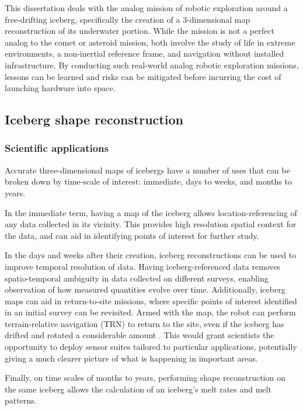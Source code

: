 This dissertation deals with the analog mission of robotic exploration around a free-drifting iceberg, specifically the creation of a 3-dimensional map reconstruction of its underwater portion. While the mission is not a perfect analog to the comet or asteroid mission, both involve the study of life in extreme environments, a non-inertial reference frame, and navigation without installed infrastructure.  By conducting such real-world analog robotic exploration missions, lessons can be learned and risks can be mitigated before incurring the cost of launching hardware into space. 

\subsection{Iceberg shape reconstruction}

\subsubsection{Scientific applications}

Accurate three-dimensional maps of icebergs have a number of uses that can be broken down by time-scale of interest: immediate, days to weeks, and months to years. 

In the immediate term, having a map of the iceberg allows location-referencing of any data collected in its vicinity. This provides high resolution spatial context for the data, and can aid in identifying points of interest for further study. 

In the days and weeks after their creation, iceberg reconstructions can be used to improve temporal resolution of data. Having iceberg-referenced data removes spatio-temporal ambiguity in data collected on different surveys, enabling observation of how measured quantities evolve over time. Additionally, iceberg maps can aid in return-to-site missions, where specific points of interest identified in an initial survey can be revisited. Armed with the map, the robot can perform terrain-relative navigation (TRN) to return to the site, even if the iceberg has drifted and rotated a considerable amount \cite{XXX}. This would grant scientists the opportunity to deploy sensor suites tailored to particular applications, potentially giving a much clearer picture of what is happening in important areas.

Finally, on time scales of months to years, performing shape reconstruction on the same iceberg allows the calculation of an iceberg's melt rates and melt patterns.

